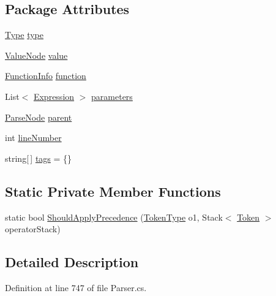 \subsection*{Package Attributes}
\begin{DoxyCompactItemize}
\item 
\hyperlink{a00098_aceddb5496ccffe668bced2d131e4bf86}{Type} \hyperlink{a00098_ad55c92df835006328bc2a79a8f91efb9}{type}
\item 
\hyperlink{a00182}{Value\-Node} \hyperlink{a00098_a569e516782891544c334ff8131b23108}{value}
\item 
\hyperlink{a00100}{Function\-Info} \hyperlink{a00098_a9c1859ce5ad4c86ded8dd0d61da61320}{function}
\item 
List$<$ \hyperlink{a00098}{Expression} $>$ \hyperlink{a00098_a7b21380bead8ae08b2cfc6594edab32c}{parameters}
\item 
\hyperlink{a00142}{Parse\-Node} \hyperlink{a00142_af313a82103fcc2ff5a177dbb06b92f7b}{parent}
\item 
int \hyperlink{a00142_a18b493382de0fde5b4299c1bd2250075}{line\-Number}
\item 
string\mbox{[}$\,$\mbox{]} \hyperlink{a00142_a58b3a15788fd2d4127d73619dc6d04ae}{tags} = \{\}
\end{DoxyCompactItemize}
\subsection*{Static Private Member Functions}
\begin{DoxyCompactItemize}
\item 
static bool \hyperlink{a00098_a5004a8eaa00b2b55856ecb4f339033fb}{Should\-Apply\-Precedence} (\hyperlink{a00045_a301aa7c866593a5b625a8fc158bbeace}{Token\-Type} o1, Stack$<$ \hyperlink{a00167}{Token} $>$ operator\-Stack)
\end{DoxyCompactItemize}


\subsection{Detailed Description}


Definition at line 747 of file Parser.\-cs.



